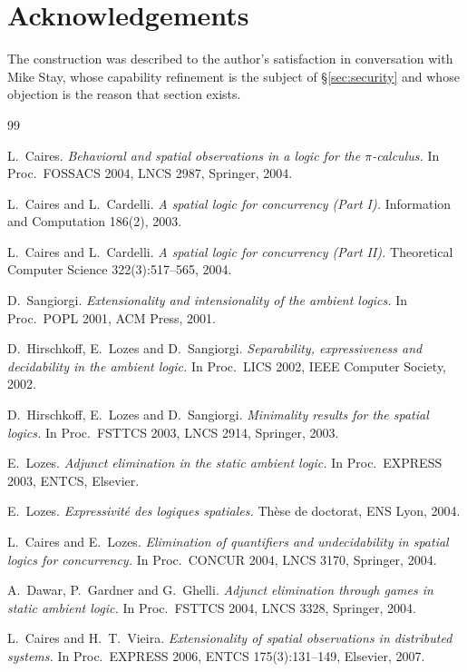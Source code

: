 \documentclass[11pt]{article}
\theoremstyle{plain}
\theoremstyle{definition}
\begin{document}
\section*{Acknowledgements}

The construction was described to the author's satisfaction in conversation with Mike Stay, whose
capability refinement is the subject of \S\ref{sec:security} and whose objection is the reason that
section exists.

\begin{thebibliography}{99}

 L.\ Caires. \emph{Behavioral and spatial observations in a logic for the
$\pi$-calculus.} In Proc.\ FOSSACS 2004, LNCS 2987, Springer, 2004.

 L.\ Caires and L.\ Cardelli. \emph{A spatial logic for concurrency (Part I).}
Information and Computation 186(2), 2003.

 L.\ Caires and L.\ Cardelli. \emph{A spatial logic for concurrency
(Part II).} Theoretical Computer Science 322(3):517--565, 2004.

 D.\ Sangiorgi. \emph{Extensionality and intensionality of the ambient logics.}
In Proc.\ POPL 2001, ACM Press, 2001.

 D.\ Hirschkoff, E.\ Lozes and D.\ Sangiorgi. \emph{Separability, expressiveness and
decidability in the ambient logic.} In Proc.\ LICS 2002, IEEE Computer Society, 2002.

 D.\ Hirschkoff, E.\ Lozes and D.\ Sangiorgi. \emph{Minimality results for the spatial
logics.} In Proc.\ FSTTCS 2003, LNCS 2914, Springer, 2003.

 E.\ Lozes. \emph{Adjunct elimination in the static ambient logic.} In Proc.\
EXPRESS 2003, ENTCS, Elsevier.

 E.\ Lozes. \emph{Expressivit\'e des logiques spatiales.} Th\`ese de doctorat,
ENS Lyon, 2004.

 L.\ Caires and E.\ Lozes. \emph{Elimination of quantifiers and undecidability in
spatial logics for concurrency.} In Proc.\ CONCUR 2004, LNCS 3170, Springer, 2004.

 A.\ Dawar, P.\ Gardner and G.\ Ghelli. \emph{Adjunct elimination through games in static
ambient logic.} In Proc.\ FSTTCS 2004, LNCS 3328, Springer, 2004.

 L.\ Caires and H.\ T.\ Vieira. \emph{Extensionality of spatial observations in
distributed systems.} In Proc.\ EXPRESS 2006, ENTCS 175(3):131--149, Elsevier, 2007.


\end{thebibliography}
\end{document}
